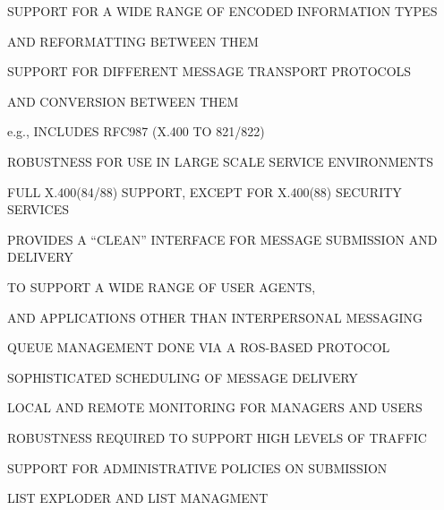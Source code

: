 \begin{bwslide}

\begin{nrtc}
\item	SUPPORT FOR A WIDE RANGE OF ENCODED INFORMATION TYPES 
    \begin{nrtc}
    \item	AND REFORMATTING BETWEEN THEM
    \end{nrtc}

\item	SUPPORT FOR DIFFERENT MESSAGE TRANSPORT PROTOCOLS
    \begin{nrtc}
    \item	AND CONVERSION BETWEEN THEM
    \end{nrtc}
    e.g., INCLUDES RFC987 (X.400 TO 821/822)

\item	ROBUSTNESS FOR USE IN LARGE SCALE SERVICE ENVIRONMENTS
\end{nrtc}
\end{bwslide}


\begin{bwslide}

\begin{nrtc}
\item	FULL X.400(84/88) SUPPORT, EXCEPT FOR X.400(88) SECURITY SERVICES

\item	PROVIDES A ``CLEAN'' INTERFACE FOR MESSAGE SUBMISSION AND DELIVERY
    \begin{nrtc}
    \item	TO SUPPORT A WIDE RANGE OF USER AGENTS,

    \item	AND APPLICATIONS OTHER THAN INTERPERSONAL MESSAGING
    \end{nrtc}

\item	QUEUE MANAGEMENT DONE VIA A ROS-BASED PROTOCOL
    \begin{nrtc}
    \item	SOPHISTICATED SCHEDULING OF MESSAGE DELIVERY

    \item	LOCAL AND REMOTE MONITORING FOR MANAGERS AND USERS

    \item	ROBUSTNESS REQUIRED TO SUPPORT HIGH LEVELS OF TRAFFIC

    \item	SUPPORT FOR ADMINISTRATIVE POLICIES ON SUBMISSION
    \end{nrtc}

\item	LIST EXPLODER AND LIST MANAGMENT    
\end{nrtc}
\end{bwslide}


